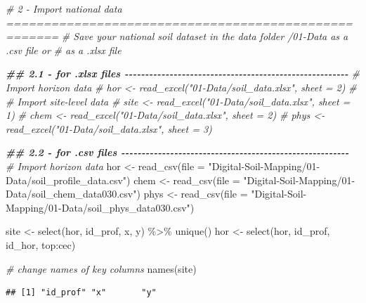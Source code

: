 \documentclass[
  10pt,
  b5paper,
  oneside]{book}
\newenvironment{Shaded}{\begin{snugshade}}{\end{snugshade}}
\newcommand{\AttributeTok}[1]{\textcolor[rgb]{0.77,0.63,0.00}{#1}}
\newcommand{\CommentTok}[1]{\textcolor[rgb]{0.56,0.35,0.01}{\textit{#1}}}
\newcommand{\DocumentationTok}[1]{\textcolor[rgb]{0.56,0.35,0.01}{\textbf{\textit{#1}}}}
\newcommand{\FunctionTok}[1]{\textcolor[rgb]{0.00,0.00,0.00}{#1}}
\newcommand{\NormalTok}[1]{#1}
\newcommand{\OtherTok}[1]{\textcolor[rgb]{0.56,0.35,0.01}{#1}}
\newcommand{\SpecialCharTok}[1]{\textcolor[rgb]{0.00,0.00,0.00}{#1}}
\newcommand{\StringTok}[1]{\textcolor[rgb]{0.31,0.60,0.02}{#1}}
\begin{document}
\begin{Shaded}
\begin{Highlighting}[]
\CommentTok{\# 2 {-} Import national data =====================================================}
\CommentTok{\# Save your national soil dataset in the data folder /01{-}Data as a .csv file or }
\CommentTok{\# as a .xlsx file}

\DocumentationTok{\#\# 2.1 {-} for .xlsx files {-}{-}{-}{-}{-}{-}{-}{-}{-}{-}{-}{-}{-}{-}{-}{-}{-}{-}{-}{-}{-}{-}{-}{-}{-}{-}{-}{-}{-}{-}{-}{-}{-}{-}{-}{-}{-}{-}{-}{-}{-}{-}{-}{-}{-}{-}{-}{-}{-}{-}{-}{-}{-}{-}{-}}
\CommentTok{\# Import horizon data }
\CommentTok{\# hor \textless{}{-} read\_excel("01{-}Data/soil\_data.xlsx", sheet = 2)}
\CommentTok{\# \# Import site{-}level data}
\CommentTok{\# site \textless{}{-} read\_excel("01{-}Data/soil\_data.xlsx", sheet = 1)}
\CommentTok{\# chem \textless{}{-} read\_excel("01{-}Data/soil\_data.xlsx", sheet = 2)}
\CommentTok{\# phys \textless{}{-} read\_excel("01{-}Data/soil\_data.xlsx", sheet = 3)}


\DocumentationTok{\#\# 2.2 {-} for .csv files {-}{-}{-}{-}{-}{-}{-}{-}{-}{-}{-}{-}{-}{-}{-}{-}{-}{-}{-}{-}{-}{-}{-}{-}{-}{-}{-}{-}{-}{-}{-}{-}{-}{-}{-}{-}{-}{-}{-}{-}{-}{-}{-}{-}{-}{-}{-}{-}{-}{-}{-}{-}{-}{-}{-}{-}}
\CommentTok{\# Import horizon data }
\NormalTok{hor }\OtherTok{\textless{}{-}} \FunctionTok{read\_csv}\NormalTok{(}\AttributeTok{file =} \StringTok{"Digital{-}Soil{-}Mapping/01{-}Data/soil\_profile\_data.csv"}\NormalTok{)}
\NormalTok{chem }\OtherTok{\textless{}{-}} \FunctionTok{read\_csv}\NormalTok{(}\AttributeTok{file =} \StringTok{"Digital{-}Soil{-}Mapping/01{-}Data/soil\_chem\_data030.csv"}\NormalTok{)}
\NormalTok{phys }\OtherTok{\textless{}{-}} \FunctionTok{read\_csv}\NormalTok{(}\AttributeTok{file =} \StringTok{"Digital{-}Soil{-}Mapping/01{-}Data/soil\_phys\_data030.csv"}\NormalTok{)}

\NormalTok{site }\OtherTok{\textless{}{-}} \FunctionTok{select}\NormalTok{(hor, id\_prof, x, y) }\SpecialCharTok{\%\textgreater{}\%} \FunctionTok{unique}\NormalTok{()}
\NormalTok{hor }\OtherTok{\textless{}{-}} \FunctionTok{select}\NormalTok{(hor, id\_prof, id\_hor, top}\SpecialCharTok{:}\NormalTok{cec)}

\CommentTok{\# change names of key columns}
\FunctionTok{names}\NormalTok{(site)}
\end{Highlighting}
\end{Shaded}

\begin{verbatim}
## [1] "id_prof" "x"       "y"
\end{verbatim}
\end{document}

